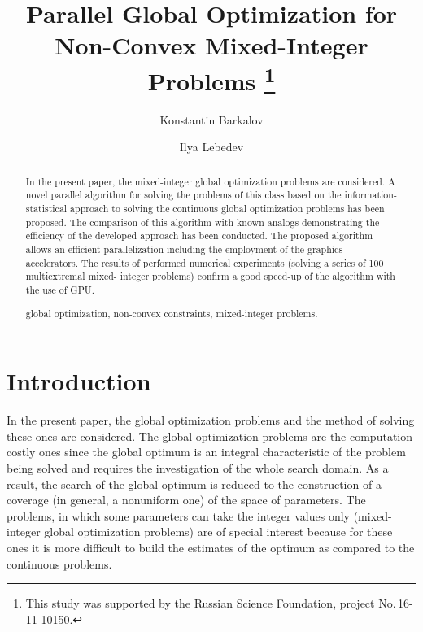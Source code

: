 \documentclass{llncs}
\begin{document}
\mainmatter 

\title{Parallel Global Optimization for Non-Convex Mixed-Integer Problems
\thanks{This study was supported by the Russian Science Foundation, 
project No.\,16-11-10150.}}
\author{Konstantin Barkalov \and Ilya Lebedev %
\\
}


\maketitle

\begin{abstract}

In the present paper, the mixed-integer global optimization problems are considered. A novel 
parallel algorithm for solving the problems of this class based on the information-statistical 
approach to solving the continuous global optimization problems has been proposed. 
The comparison of this algorithm with known analogs demonstrating the efficiency of the 
developed approach has been conducted. 
The proposed algorithm allows an efficient parallelization including the employment of the 
graphics accelerators. 
The results of performed numerical experiments (solving a series of 100 multiextremal mixed-
integer problems) confirm a good speed-up of the algorithm with the use of GPU. 

\keywords global optimization, non-convex constraints, mixed-integer problems.

\end{abstract}

\section{Introduction}\label{sec:intro}

In the present paper, the global optimization problems and the method of solving these ones are 
considered. The global optimization problems are the computation-costly ones since the global 
optimum is an integral characteristic of the problem being solved and requires the investigation 
of the whole search domain. 
As a result, the search of the global optimum is reduced to the construction of a coverage (in 
general, a nonuniform one) of the space of parameters. 
The problems, in which some parameters can take the integer values only (mixed-integer global 
optimization problems) are of special interest because for these ones it is more difficult to build 
the estimates of the optimum as compared to the continuous problems.
\end{document}
